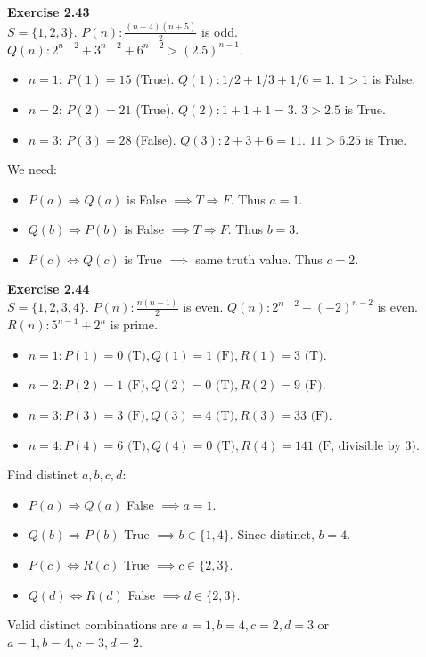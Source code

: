 \documentclass[11pt]{article}
\begin{document}
\vspace{10pt}
\textbf{Exercise 2.43} \\
$S=\{1,2,3\}$. $P(n): \frac{(n+4)(n+5)}{2}$ is odd. $Q(n): 2^{n-2} + 3^{n-2} + 6^{n-2} > (2.5)^{n-1}$.
\begin{itemize}
    \item $n=1$: $P(1) = 15$ (True). $Q(1): 1/2 + 1/3 + 1/6 = 1$. $1 > 1$ is False.
    \item $n=2$: $P(2) = 21$ (True). $Q(2): 1 + 1 + 1 = 3$. $3 > 2.5$ is True.
    \item $n=3$: $P(3) = 28$ (False). $Q(3): 2 + 3 + 6 = 11$. $11 > 6.25$ is True.
\end{itemize}
We need:
\begin{itemize}
    \item $P(a) \Rightarrow Q(a)$ is False $\implies T \Rightarrow F$. Thus \textbf{$a=1$}.
    \item $Q(b) \Rightarrow P(b)$ is False $\implies T \Rightarrow F$. Thus \textbf{$b=3$}.
    \item $P(c) \Leftrightarrow Q(c)$ is True $\implies$ same truth value. Thus \textbf{$c=2$}.
\end{itemize}

\vspace{10pt}
\textbf{Exercise 2.44} \\
$S=\{1,2,3,4\}$. $P(n): \frac{n(n-1)}{2}$ is even. $Q(n): 2^{n-2} - (-2)^{n-2}$ is even. $R(n): 5^{n-1} + 2^n$ is prime.
\begin{itemize}
    \item $n=1: P(1)=0 \text{ (T)}, Q(1)=1 \text{ (F)}, R(1)=3 \text{ (T)}$.
    \item $n=2: P(2)=1 \text{ (F)}, Q(2)=0 \text{ (T)}, R(2)=9 \text{ (F)}$.
    \item $n=3: P(3)=3 \text{ (F)}, Q(3)=4 \text{ (T)}, R(3)=33 \text{ (F)}$.
    \item $n=4: P(4)=6 \text{ (T)}, Q(4)=0 \text{ (T)}, R(4)=141 \text{ (F, divisible by 3)}$.
\end{itemize}
Find distinct $a,b,c,d$:
\begin{itemize}
    \item $P(a) \Rightarrow Q(a)$ False $\implies a=1$.
    \item $Q(b) \Rightarrow P(b)$ True $\implies b \in \{1,4\}$. Since distinct, \textbf{$b=4$}.
    \item $P(c) \Leftrightarrow R(c)$ True $\implies c \in \{2,3\}$.
    \item $Q(d) \Leftrightarrow R(d)$ False $\implies d \in \{2,3\}$.
\end{itemize}
Valid distinct combinations are \textbf{$a=1, b=4, c=2, d=3$} or \textbf{$a=1, b=4, c=3, d=2$}.
\end{document}
